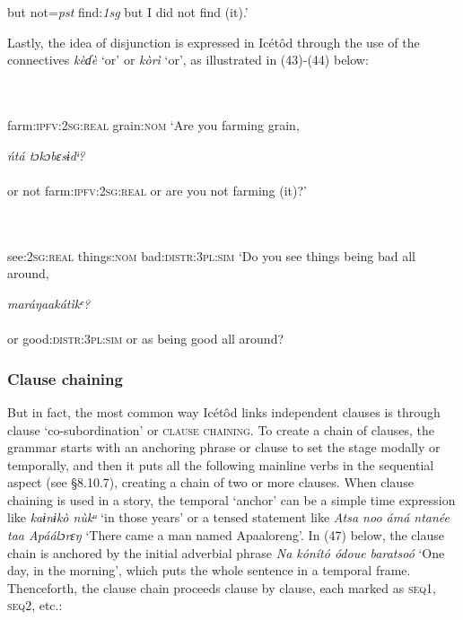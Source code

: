 \ea\label{ex:}
 \\
    \\
but   not=\textit{pst}   find:\textit{1sg}
\glt but I did not find (it).’
\z  

Lastly, the idea of disjunction is expressed in Icétôd through the use of the connectives \textit{kèɗè} ‘or’ or \textit{kòrì} ‘or’, as illustrated in (43)-(44) below:



\ea\label{ex:}
  \\
    \\
farm:\textsc{ipfv:2sg:real}   grain:\textsc{nom}
\glt ‘Are you farming grain, 
\z



\ea\label{ex:}
\textit{   ńtá   tɔkɔbɛsɨdᶤ?} \\
    \\
or   not   farm:\textsc{ipfv:2sg:real}
\glt or are you not farming (it)?’
\z  



\ea\label{ex:}
 \\
    \\
see:\textsc{2sg:real}   things:\textsc{nom}   bad:\textsc{distr:3pl:sim}
\glt ‘Do you see things being bad all around, 
\z



\ea\label{ex:}
\textit{   maráŋaakátìkᵉ?} \\
    \\
or   good:\textsc{distr:3pl:sim}
\glt or as being good all around?
\z  



\subsubsection{Clause chaining}

But in fact, the most common way Icétôd links independent clauses is through clause ‘co-subordination’ or \textsc{clause chaining}. To create a chain of clauses, the grammar starts with an anchoring phrase or clause to set the stage modally or temporally, and then it puts all the following mainline verbs in the sequential aspect (see §8.10.7), creating a chain of two or more clauses. When clause chaining is used in a story, the temporal ‘anchor’ can be a simple time expression like \textit{kaɨnɨkò nùkᵘ} ‘in those years’ or a tensed statement like \textit{Atsa noo ámá ntanée taa Apáálɔrɛŋ} ‘There came a man named Apaaloreng’. In (47) below, the clause chain is anchored by the initial adverbial phrase \textit{Na kónít}\textit{ó ódoue baratsoó} ‘One day, in the morning’, which puts the whole sentence in a temporal frame. Thenceforth, the clause chain proceeds clause by clause, each marked as \textsc{seq1}, \textsc{seq2}, etc.:




